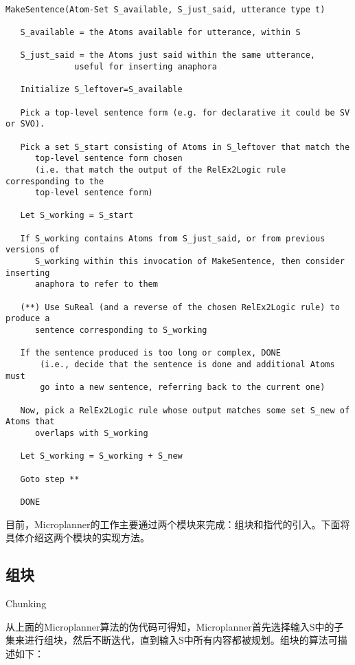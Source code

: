\begin{verbatim}

MakeSentence(Atom-Set S_available, S_just_said, utterance type t)

   S_available = the Atoms available for utterance, within S

   S_just_said = the Atoms just said within the same utterance,
              useful for inserting anaphora

   Initialize S_leftover=S_available

   Pick a top-level sentence form (e.g. for declarative it could be SV or SVO).

   Pick a set S_start consisting of Atoms in S_leftover that match the 
      top-level sentence form chosen
      (i.e. that match the output of the RelEx2Logic rule corresponding to the
      top-level sentence form)

   Let S_working = S_start

   If S_working contains Atoms from S_just_said, or from previous versions of
      S_working within this invocation of MakeSentence, then consider inserting
      anaphora to refer to them

   (**) Use SuReal (and a reverse of the chosen RelEx2Logic rule) to produce a 
      sentence corresponding to S_working  
   
   If the sentence produced is too long or complex, DONE
       (i.e., decide that the sentence is done and additional Atoms must
       go into a new sentence, referring back to the current one)

   Now, pick a RelEx2Logic rule whose output matches some set S_new of Atoms that
      overlaps with S_working

   Let S_working = S_working + S_new

   Goto step **

   DONE

\end{verbatim}


目前，Microplanner的工作主要通过两个模块来完成：组块和指代的引入。下面将具体介绍这两个模块的实现方法。

\subsection{组块}{Chunking}

从上面的Microplanner算法的伪代码可得知，Microplanner首先选择输入S中的子集来进行组块，然后不断迭代，直到输入S中所有内容都被规划。组块的算法可描述如下：

